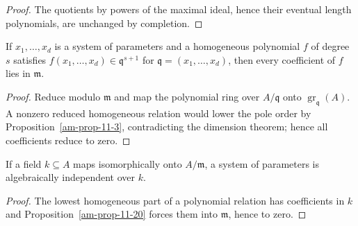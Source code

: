 \begin{proof}
The quotients by powers of the maximal ideal, hence their eventual length
polynomials, are unchanged by completion.
\end{proof}
\begin{proposition}
\label{am-prop-11-20}
\uses{}
If $x_1,\ldots,x_d$ is a system of parameters and a homogeneous polynomial
$f$ of degree $s$ satisfies $f(x_1,\ldots,x_d)\in\mathfrak{q}^{s+1}$ for
$\mathfrak{q}=(x_1,\ldots,x_d)$, then every coefficient of $f$ lies in $\mathfrak{m}$.
\end{proposition}
\begin{proof}
Reduce modulo $\mathfrak{m}$ and map the polynomial ring over $A/\mathfrak{q}$ onto
$\operatorname{gr}_\mathfrak{q}(A)$.  A nonzero reduced homogeneous relation would lower
the pole order by Proposition~\ref{am-prop-11-3}, contradicting the dimension
theorem; hence all coefficients reduce to zero.
\end{proof}
\begin{corollary}
\label{am-cor-11-21}
\uses{}
If a field $k\subseteq A$ maps isomorphically onto $A/\mathfrak{m}$, a system of
parameters is algebraically independent over $k$.
\end{corollary}
\begin{proof}
The lowest homogeneous part of a polynomial relation has coefficients in $k$
and Proposition~\ref{am-prop-11-20} forces them into $\mathfrak{m}$, hence to zero.
\end{proof}

